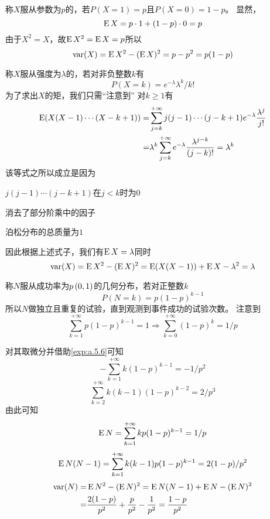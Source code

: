 \documentclass[../main.tex]{subfiles}
\begin{document}
\begin{example}
	称\(X\)服从参数为\(p\)的，若\(P(X=1)=p\)且\(P(X=0)=1-p\)。
	显然，
	\[\operatorname{E} X=p\cdot 1+(1-p)\cdot 0=p\]
	由于\(X^2=X\)，故\(\operatorname{E} X^2=\operatorname{E} X=p\)所以
	\[\operatorname{var}(X)=\operatorname{E} X^2-(\operatorname{E} X)^2=p-p^2=p(1-p)\]
\end{example}
\begin{example}
	称\(X\)服从强度为\(\lambda\)的，若对非负整数\(k\)有
	\[P(X=k)=e^{-\lambda}\lambda^k/k!\]
	为了求出\(X\)的矩，我们只需``注意到''
	对\(k\geq1\)有
	\[\begin{split}
		\operatorname{E}(X(X-1)\cdots(X-k+1))=&\sum_{j=k}^{+\infty}j(j-1)\cdots(j-k+1)e^{-\lambda}\frac{\lambda^j}{j!}\\
		=&\lambda^k\sum_{j=k}^{+\infty}e^{-\lambda}\frac{\lambda^{j-k}}{(j-k)!}=\lambda^k
	\end{split}\]
	该等式之所以成立是因为
	\begin{enumerate*}
		\item \(j(j-1)\cdots(j-k+1)\)在\(j<k\)时为0
		\item 消去了部分阶乘中的因子
		\item 泊松分布的总质量为\(1\)
	\end{enumerate*}
	因此根据上述式子，我们有\(\operatorname{E} X=\lambda\)同时
	\[\operatorname{var}(X)=\operatorname{E} X^2-(\operatorname{E} X)^2=\operatorname{E}(X(X-1))+\operatorname{E} X-\lambda^2=\lambda\]
\end{example}
\begin{example}
	称\(N\)服从成功率为\(p\intoo{0,1}\)的几何分布，若对正整数\(k\)
	\[P(N=k)=p(1-p)^{k-1}\]
	所以\(N\)做独立且重复的试验，直到观测到事件成功的试验次数。
	注意到
	\[\sum_{k=1}^{+\infty}p(1-p)^{k-1}=1\Rightarrow\sum_{k=0}^{+\infty}(1-p)^{k}=1/p\]
\end{example}
对其取微分并借助\ref{exp:a.5.6}可知
\[-\sum_{k=1}^{+\infty}k(1-p)^{k-1}=-1/p^2\]
\[\sum_{k=2}^{+\infty}k(k-1)(1-p)^{k-2}=2/p^3\]
由此可知
\[\operatorname{E} N=\sum_{k=1}^{+\infty}kp(1-p)^{k-1}=1/p\]
\[\operatorname{E} N(N-1)=\sum_{k=1}^{+\infty}k(k-1)p(1-p)^{k-1}=2(1-p)/p^2\]
\[\begin{split}
	\operatorname{var}(N)=&\operatorname{E} N^2-(\operatorname{E} N)^2=\operatorname{E} N(N-1)+\operatorname{E} N-(\operatorname{E} N)^2\\
	=&\frac{2(1-p)}{p^2}+\frac{p}{p^2}-\frac{1}{p^2}
	=\frac{1-p}{p^2}
\end{split}\]
\end{document}
